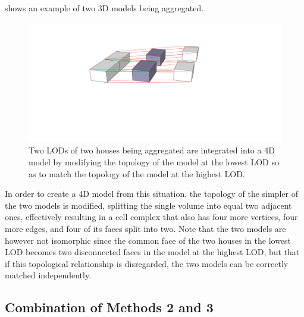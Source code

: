  shows an example of two 3D models being aggregated.
\begin{figure}[tb]
   \centering
   \includegraphics[width=\linewidth]{figs/agg2}
   \caption[Linking using topology modifications]{Two LODs of two houses being aggregated are integrated into a 4D model by modifying the topology of the model at the lowest LOD so as to match the topology of the model at the highest LOD.}
\label{fig:agg}
\end{figure}
In order to create a 4D model from this situation, the topology of the simpler of the two models is modified, splitting the single volume into equal two adjacent ones, effectively resulting in a cell complex that also has four more vertices, four more edges, and four of its faces split into two.
Note that the two models are however not isomorphic since the common face of the two houses in the lowest LOD becomes two disconnected faces in the model at the highest LOD, but that if this topological relationship is disregarded, the two models can be correctly matched independently.

\subsection{Combination of Methods 2 and 3}

